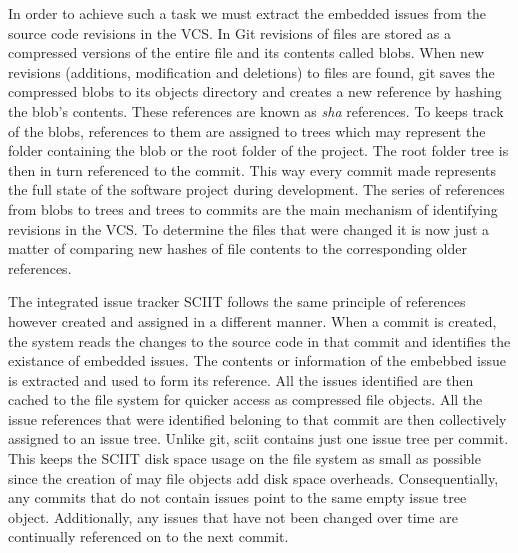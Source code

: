 \documentclass{mproj}
\begin{document}

In order to achieve such a task we must extract the embedded issues from the source code revisions in the VCS. In Git revisions of files are stored as a compressed versions of the entire file and its contents called blobs. When new revisions (additions, modification and deletions) to files are found, git saves the compressed blobs to its objects directory and creates a new reference by hashing the blob's contents. These references are known as \textit{sha} references. To keeps track of the blobs, references to them are assigned to trees which may represent the folder containing the blob or the root folder of the project.  The root folder tree is then in turn referenced to the commit. This way every commit made represents the full state of the software project during development. The series of references from blobs to trees and trees to commits are the main mechanism of identifying revisions in the VCS. To determine the files that were changed it is now just a matter of comparing new hashes of file contents to the corresponding older references.


The integrated issue tracker SCIIT follows the same principle of references however created and assigned in a different manner. When a commit is created, the system reads the changes to the source code in that commit and identifies the existance of embedded issues. The contents or information of the embebbed issue is extracted and used to form its reference. All the issues identified are then cached to the file system for quicker access as compressed file objects. All the issue references that were identified beloning to that commit are then collectively assigned to an issue tree. Unlike git, sciit contains just one issue tree per commit. This keeps the SCIIT disk space usage on the file system as small as possible since the creation of may file objects add disk space overheads. Consequentially, any commits that do not contain issues point to the same empty issue tree object. Additionally, any issues that have not been changed over time are continually referenced on to the next commit.
\end{document}

